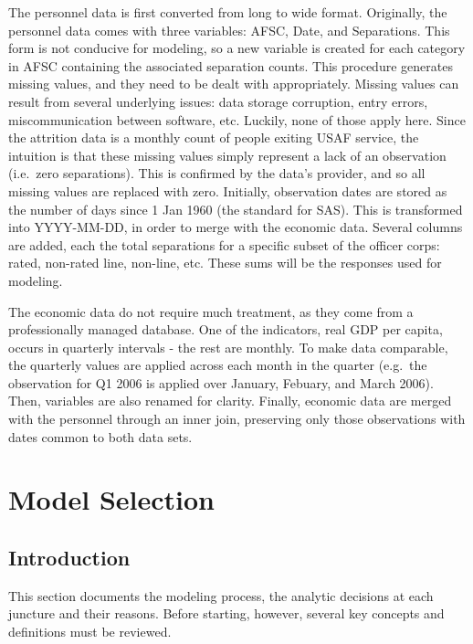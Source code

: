 \documentclass[12pt,letterpaper,toc=flat,oneside]{report}
\theoremstyle{definition}
\theoremstyle{definition}
\theoremstyle{definition}
\theoremstyle{remark}
\begin{document}
The personnel data is first converted from long to wide format.
Originally, the personnel data comes with three variables: AFSC, Date,
and Separations. This form is not conducive for modeling, so a new
variable is created for each category in AFSC containing the associated
separation counts. This procedure generates missing values, and they
need to be dealt with appropriately. Missing values can result from
several underlying issues: data storage corruption, entry errors,
miscommunication between software, etc. Luckily, none of those apply
here. Since the attrition data is a monthly count of people exiting USAF
service, the intuition is that these missing values simply represent a
lack of an observation (i.e.~zero separations). This is confirmed by the
data's provider, and so all missing values are replaced with zero.
Initially, observation dates are stored as the number of days since 1
Jan 1960 (the standard for SAS). This is transformed into YYYY-MM-DD, in
order to merge with the economic data. Several columns are added, each
the total separations for a specific subset of the officer corps: rated,
non-rated line, non-line, etc. These sums will be the responses used for
modeling.

The economic data do not require much treatment, as they come from a
professionally managed database. One of the indicators, real GDP per
capita, occurs in quarterly intervals - the rest are monthly. To make
data comparable, the quarterly values are applied across each month in
the quarter (e.g.~the observation for Q1 2006 is applied over January,
Febuary, and March 2006). Then, variables are also renamed for clarity.
Finally, economic data are merged with the personnel through an inner
join, preserving only those observations with dates common to both data
sets.

\hypertarget{model-selection}{%
\section{Model Selection}\label{model-selection}}

\hypertarget{introduction-2}{%
\subsection{Introduction}\label{introduction-2}}

This section documents the modeling process, the analytic decisions at
each juncture and their reasons. Before starting, however, several key
concepts and definitions must be reviewed.
\end{document}
